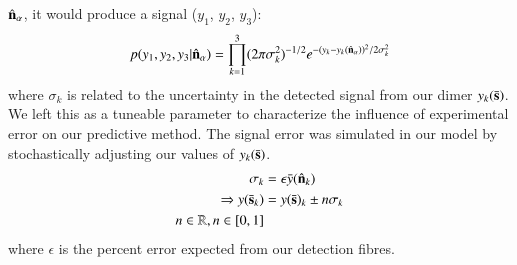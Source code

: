 \documentclass[final, 3p]{elsarticle}
\begin{document}
$\hat{\bf n}_\alpha$, it would produce a signal ($y_1$, $y_2$, $y_3$):
\begin{align}
\label{eq:conditional}
  p(y_1, y_2, y_3|\hat{\bf n}_\alpha)
  = \prod^3_{k=1}
(2\pi\sigma_k^2)^{-1/2} 
e^{-(y_{k}-y_{k}(\hat{\bf n}_\alpha))^2/2\sigma_k^2}
\end{align}
where $\sigma_k$ is related to the uncertainty in the detected signal
from our dimer $y_k(\bar{\bf s})$.  We left this as a tuneable
parameter to characterize the influence of experimental error on our
predictive method.  The signal error was simulated in our model by
stochastically adjusting our values of $y_k(\bar{\bf s})$.
\begin{eqnarray*}
  \sigma_k
  &= \epsilon\bar{y}(\hat{\bf n}_k)
  \\
  \Rightarrow y(\bar{\bf s}_k) &= y(\bar{\bf s})_k \pm n\sigma_k
  \\ 
n \in \mathbb{R}, n\in[0,1]
\end{eqnarray*} 
where $\epsilon$ is the percent error expected from our detection
fibres.
\end{document}
